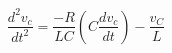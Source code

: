 \documentclass[preview]{standalone}
\begin{document}
\begin{center}
\[\frac{d^2v_c}{dt^2} = \frac{-R}{LC} \left( C \frac{dv_c}{dt} \right) - \frac{v_C}{L}\]
\end{center}
\end{document}
